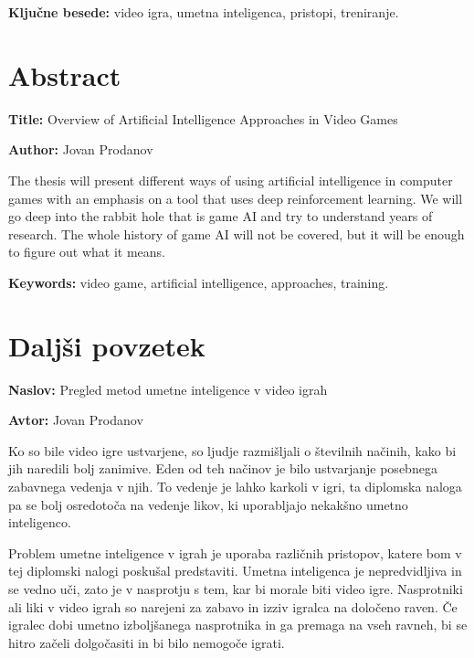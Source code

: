 \documentclass[a4paper,12pt,openright]{book}
\newcommand{\ttitle}{Pregled metod umetne inteligence v video igrah}
\newcommand{\ttitleEn}{Overview of Artificial Intelligence Approaches in Video Games}
\newcommand{\tauthor}{Jovan Prodanov}
\newcommand{\tkeywords}{video igra, umetna inteligenca, pristopi, treniranje}
\newcommand{\tkeywordsEn}{video game, artificial intelligence, approaches, training}
\newcommand{\clearemptydoublepage}{\newpage{\pagestyle{empty}\cleardoublepage}}
\begin{document}
\noindent\textbf{Ključne besede:} \tkeywords.
\clearemptydoublepage



\chapter*{Abstract}

\noindent\textbf{Title:} \ttitleEn
\bigskip

\noindent\textbf{Author:} \tauthor
\bigskip

\noindent 
The thesis will present different ways of using artificial intelligence in computer games with an emphasis on a tool that uses deep reinforcement learning.
We will go deep into the rabbit hole that is game AI and try to understand years of research. The whole history of game AI will not be covered, but it will be enough to figure out what it means.
\bigskip



\noindent\textbf{Keywords:} \tkeywordsEn.
\clearemptydoublepage



\chapter*{Daljši povzetek}

\noindent\textbf{Naslov:} \ttitle
\bigskip

\noindent\textbf{Avtor:} \tauthor
\bigskip

Ko so bile video igre ustvarjene, so ljudje razmišljali o številnih načinih, kako bi jih naredili bolj zanimive. Eden od teh načinov je bilo ustvarjanje posebnega zabavnega vedenja v njih. To vedenje je lahko karkoli v igri, ta diplomska naloga pa se bolj osredotoča na vedenje likov, ki uporabljajo nekakšno umetno inteligenco.

Problem umetne inteligence v igrah je uporaba različnih pristopov, katere bom v tej diplomski nalogi poskušal predstaviti. Umetna inteligenca je nepredvidljiva in se vedno uči, zato je v nasprotju s tem, kar bi morale biti video igre. Nasprotniki ali liki v video igrah so narejeni za zabavo in izziv igralca na določeno raven. Če igralec dobi umetno izboljšanega nasprotnika in ga premaga na vseh ravneh, bi se hitro začeli dolgočasiti in bi bilo nemogoče igrati.
\end{document}
